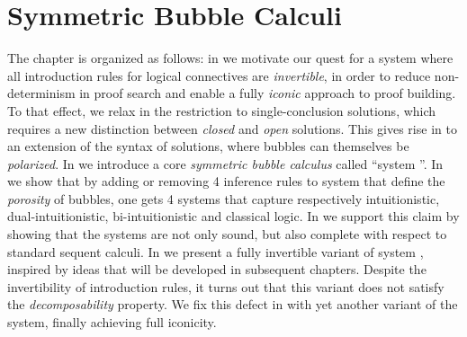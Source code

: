 \setchapterpreamble[u]{\margintoc}
\chapter{Symmetric Bubble Calculi}


The chapter is organized as follows: in  we motivate our
quest for a system where all introduction rules for logical connectives are
\emph{invertible}, in order to reduce non-determinism in proof search and enable
a fully \emph{iconic} approach to proof building. To that effect, we relax in
 the restriction to single-conclusion solutions, which
requires a new distinction between \emph{closed} and \emph{open} solutions. This
gives rise in  to an extension of the syntax of solutions, where
bubbles can themselves be \emph{polarized}. In  we
introduce a core \emph{symmetric bubble calculus} called ``system ''. In
 we show that by adding or removing 4 inference rules
to system  that define the \emph{porosity} of bubbles, one gets 4 systems
that capture respectively intuitionistic, dual-intuitionistic, bi-intuitionistic
and classical logic. In  we support this claim by
showing that the systems are not only sound, but also complete with respect to
standard sequent calculi. In  we present a fully
invertible variant of system , inspired by ideas that will be developed
in subsequent chapters. Despite the invertibility of introduction rules, it
turns out that this variant does not satisfy the \emph{decomposability}
property. We fix this defect in  with yet another
variant of the system, finally achieving full iconicity.




